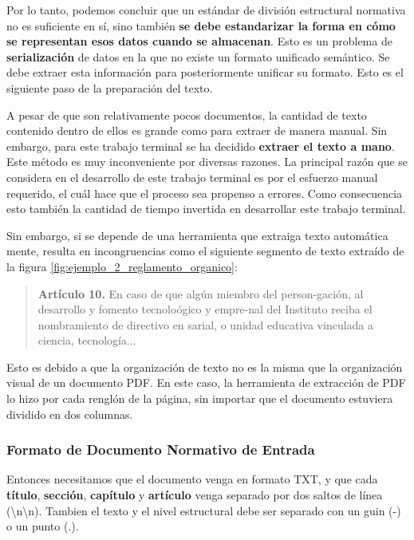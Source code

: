 Por lo tanto, podemos concluir que un estándar de división estructural normativa no es suficiente en sí, sino también \textbf{se debe estandarizar la forma en cómo se representan esos datos cuando se almacenan}. Esto es un problema de \textbf{serialización} de datos en la que no existe un formato unificado semántico. Se debe extraer esta información para posteriormente unificar su formato. Esto es el siguiente paso de la preparación del texto.

A pesar de que son relativamente pocos documentos, la cantidad de texto contenido dentro de ellos es grande como para extraer de manera manual. Sin embargo, para este trabajo terminal se ha decidido \textbf{extraer el texto a mano}. Este método es muy inconveniente por diversas razones. La principal razón que se considera en el desarrollo de este trabajo terminal es por el esfuerzo manual requerido, el cuál hace que el proceso sea propenso a errores. Como consecuencia esto también la cantidad de tiempo invertida en desarrollar este trabajo terminal.

Sin embargo, si se depende de una herramienta que extraiga texto automática mente, resulta en incongruencias como el siguiente segmento de texto extraído de la figura \ref{fig:ejemplo_2_reglamento_organico}:

\begin{quote}
    \textbf{Artículo 10.} En caso de que algún miembro del person-gación, al desarrollo y fomento tecnoloógico y empre-nal del Instituto reciba el nombramiento de directivo en sarial, o unidad educativa vinculada a ciencia, tecnología...
\end{quote}

Esto es debido a que la organización de texto no es la misma que la organización visual de un documento PDF. En este caso, la herramienta de extracción de PDF lo hizo por cada renglón de la página, sin importar que el documento estuviera dividido en dos columnas.

\newpage
\subsubsection{Formato de Documento Normativo de Entrada}

Entonces necesitamos que el documento venga en formato TXT, y que cada \textbf{título}, \textbf{sección}, \textbf{capítulo} y \textbf{artículo} venga separado por dos saltos de línea (\textbackslash n\textbackslash n). Tambien el texto y el nivel estructural debe ser separado con un guin (-) o un punto (.).

